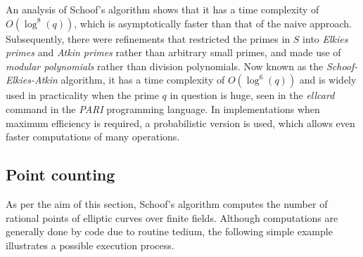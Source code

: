 \documentclass{article}
\newcommand{\rb}[1]{\left( #1 \right)}
\theoremstyle{definition}
\begin{document}
An analysis of Schoof's algorithm shows that it has a time complexity of $ O\rb{\log^8\rb{q}} $, which is asymptotically faster than that of the naive approach. Subsequently, there were refinements that restricted the primes in $ S $ into \emph{Elkies primes} and \emph{Atkin primes} rather than arbitrary small primes, and made use of \emph{modular polynomials} rather than division polynomials. Now known as the \emph{Schoof-Elkies-Atkin} algorithm, it has a time complexity of $ O\rb{\log^6\rb{q}} $ and is widely used in practicality when the prime $ q $ in question is huge, seen in the \emph{ellcard} command in the \emph{PARI} programming language. In implementations when maximum efficiency is required, a probabilistic version is used, which allows even faster computations of many operations.

\pagebreak

\subsection{Point counting}

As per the aim of this section, Schoof's algorithm computes the number of rational points of elliptic curves over finite fields. Although computations are generally done by code due to routine tedium, the following simple example illustrates a possible execution process.
\end{document}
